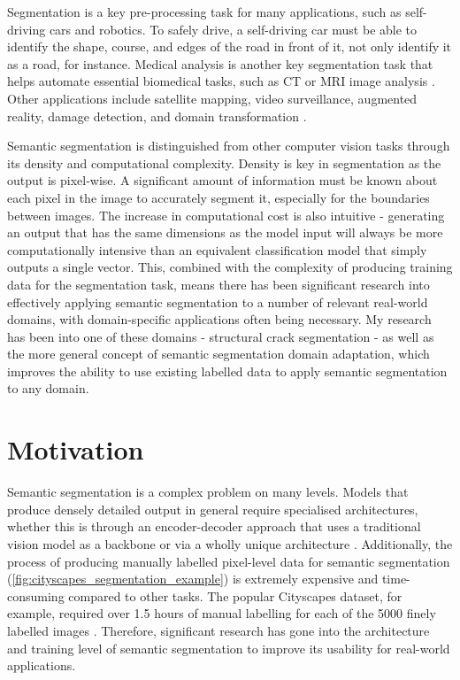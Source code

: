 \documentclass[a4paper,12pt]{report}
\begin{document}
Segmentation is a key pre-processing task for many applications, such as self-driving cars and robotics. To safely drive, a self-driving car must be able to identify the shape, course, and edges of the road in front of it, not only identify it as a road, for instance. Medical analysis is another key segmentation task that helps automate essential biomedical tasks, such as CT or MRI image analysis \cite{hesamian_deep_2019}. Other applications include satellite mapping, video surveillance, augmented reality, damage detection, and domain transformation \cite{richter_enhancing_2021}.

Semantic segmentation is distinguished from other computer vision tasks through its density and computational complexity. Density is key in segmentation as the output is pixel-wise. A significant amount of information must be known about each pixel in the image to accurately segment it, especially for the boundaries between images. The increase in computational cost is also intuitive - generating an output that has the same dimensions as the model input will always be more computationally intensive than an equivalent classification model that simply outputs a single vector. This, combined with the complexity of producing training data for the segmentation task, means there has been significant research into effectively applying semantic segmentation to a number of relevant real-world domains, with domain-specific applications often being necessary. My research has been into one of these domains - structural crack segmentation - as well as the more general concept of semantic segmentation domain adaptation, which improves the ability to use existing labelled data to apply semantic segmentation to any domain.

\section{Motivation}
Semantic segmentation is a complex problem on many levels. Models that produce densely detailed output in general require specialised architectures, whether this is through an encoder-decoder approach that uses a traditional vision model as a backbone \cite{chen_deeplab_2017} or via a wholly unique architecture \cite{yu_bisenet_2018}. Additionally, the process of producing manually labelled pixel-level data for semantic segmentation (\autoref{fig:cityscapes_segmentation_example}) is extremely expensive and time-consuming compared to other tasks. The popular Cityscapes dataset, for example, required over 1.5 hours of manual labelling for each of the 5000 finely labelled images \cite{cordts_cityscapes_2016}. Therefore, significant research has gone into the architecture and training level of semantic segmentation to improve its usability for real-world applications.
\end{document}
